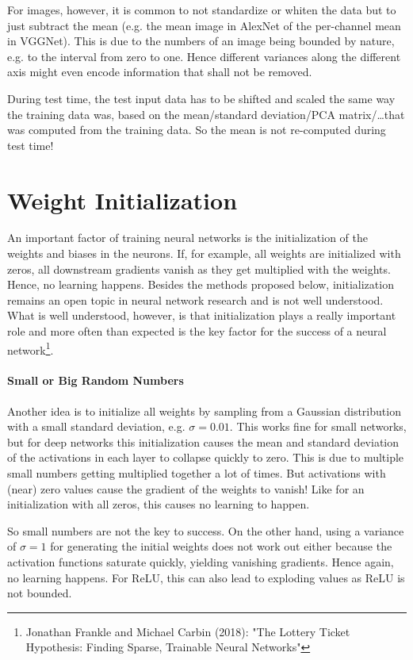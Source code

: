 		For images, however, it is common to not standardize or whiten the data but to just subtract the mean (e.g. the mean image in AlexNet of the per-channel mean in VGGNet). This is due to the numbers of an image being bounded by nature, e.g. to the interval from zero to one. Hence different variances along the different axis might even encode information that shall not be removed.

		During test time, the test input data has to be shifted and scaled the same way the training data was, based on the mean/standard deviation/PCA matrix/\dots that was computed from the training data. So the mean is not re-computed during test time!

	\section{Weight Initialization}
		An important factor of training neural networks is the initialization of the weights and biases in the neurons. If, for example, all weights are initialized with zeros, all downstream gradients vanish as they get multiplied with the weights. Hence, no learning happens. Besides the methods proposed below, initialization remains an open topic in neural network research and is not well understood. What is well understood, however, is that initialization plays a really important role and more often than expected is the key factor for the success of a neural network\footnote{Jonathan Frankle and Michael Carbin (2018): "The Lottery Ticket Hypothesis: Finding Sparse, Trainable Neural Networks"}.

		\paragraph{Small or Big Random Numbers}
			Another idea is to initialize all weights by sampling from a Gaussian distribution with a small standard deviation, e.g. \( \sigma = 0.01 \). This works fine for small networks, but for deep networks this initialization causes the mean and standard deviation of the activations in each layer to collapse quickly to zero. This is due to multiple small numbers getting multiplied together a lot of times. But activations with (near) zero values cause the gradient of the weights to vanish! Like for an initialization with all zeros, this causes no learning to happen.

			So small numbers are not the key to success. On the other hand, using a variance of \( \sigma = 1 \) for generating the initial weights does not work out either because the activation functions saturate quickly, yielding vanishing gradients. Hence again, no learning happens. For ReLU, this can also lead to exploding values as ReLU is not bounded.

